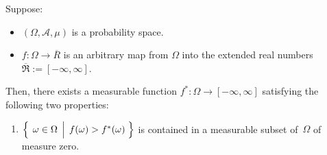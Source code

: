 \begin{lemma}
\mbox{}\vskip 0.1cm
\noindent
Suppose:
\begin{itemize}
\item
	$(\Omega,\mathcal{A},\mu)$ is a probability space.
\item
	$f : \Omega \longrightarrow \overline{R}$
	is an arbitrary map from $\Omega$ into the extended real numbers
	$\overline{\Re} := [-\infty,\infty]$.
\end{itemize}
Then, there exists a measurable function $f^{*} : \Omega \longrightarrow [-\infty,\infty]$
satisfying the following two properties:
\begin{enumerate}
\item
	$\left\{\;\left.\omega\overset{{\color{white}.}}{\in}\Omega\;\,\right\vert\; f(\omega) > f^{*}(\omega)\;\right\}$
	is contained in a measurable subset of \,$\Omega$ of measure zero.
\end{enumerate}
\end{lemma}


